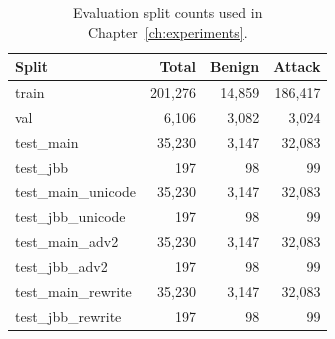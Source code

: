 \begin{table}[t]
\centering
\caption{Evaluation split counts used in Chapter~\ref{ch:experiments}.}
\label{tab:exp_split_counts}
\begin{tabular}{lrrr}
\toprule
Split & Total & Benign & Attack \\
\midrule
train & 201,276 & 14,859 & 186,417 \\
val & 6,106 & 3,082 & 3,024 \\
test\_main & 35,230 & 3,147 & 32,083 \\
test\_jbb & 197 & 98 & 99 \\
test\_main\_unicode & 35,230 & 3,147 & 32,083 \\
test\_jbb\_unicode & 197 & 98 & 99 \\
test\_main\_adv2 & 35,230 & 3,147 & 32,083 \\
test\_jbb\_adv2 & 197 & 98 & 99 \\
test\_main\_rewrite & 35,230 & 3,147 & 32,083 \\
test\_jbb\_rewrite & 197 & 98 & 99 \\
\bottomrule
\end{tabular}
\end{table}